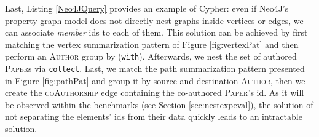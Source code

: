 Last, Listing \ref{Neo4JQuery} provides an example of Cypher: even if Neo4J's property graph model does not directly nest graphs inside vertices or edges, we can associate \textit{member} ids to each of them. This solution can be achieved by  first matching the vertex summarization pattern of Figure \ref{fig:vertexPat} and then perform an \textsc{Author} group by (\texttt{with}). Afterwards, we nest the set of authored \textsc{Paper}s via \texttt{collect}. Last, we match the path summarization pattern presented in Figure \ref{fig:pathPat} and group it by source and destination \textsc{Author}, then we create the \textsc{coAuthorship} edge containing the co-authored \textsc{Paper}'s id. As it will be observed within the benchmarks (see Section \ref{sec:nestexpeval}), the solution of not separating the elements' ids from their data quickly leads to an intractable solution.